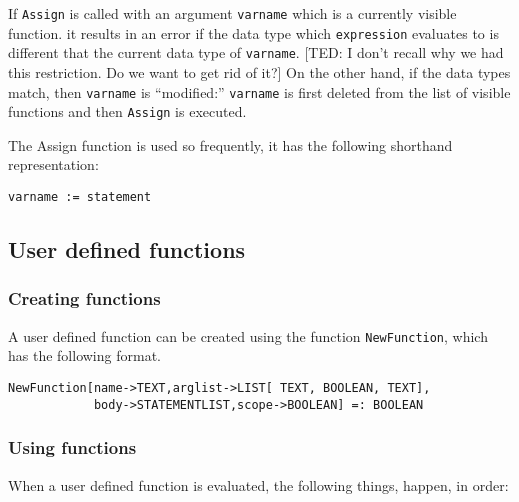 If \verb+Assign+ is called with an argument \verb+varname+ which is a
currently visible function. it results in an error if the data type
which \verb+expression+ evaluates to is different that the current
data type of \verb+varname+.  [TED: I don't recall why we had this
restriction.  Do we want to get rid of it?] On the other hand, if the
data types match, then \verb+varname+ is ``modified:'' \verb+varname+
is first deleted from the list of visible functions and then
\verb+Assign+ is executed.  

The Assign function is used so frequently, it has the following shorthand
representation:
\begin{verbatim}
varname := statement
\end{verbatim}

\subsection{User defined functions}

\subsubsection{Creating functions}
A user defined function can be created using the function
\verb+NewFunction+, which has the following format.

\begin{verbatim}
NewFunction[name->TEXT,arglist->LIST[ TEXT, BOOLEAN, TEXT], 
            body->STATEMENTLIST,scope->BOOLEAN] =: BOOLEAN
\end{verbatim}

\subsubsection{Using functions}

When a user defined function is evaluated, the following things,
happen, in order:


